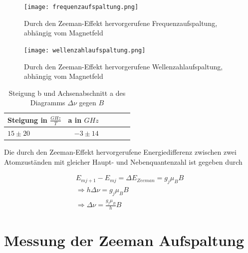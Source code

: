 \documentclass[10pt,a4paper]{article}
\begin{document}
\begin{figure}[h]
	\texttt{[image: frequenzaufspaltung.png]}
	\centering
	\caption{Durch den Zeeman-Effekt hervorgerufene Frequenzaufspaltung, abhängig vom Magnetfeld}
	\label{diagramm_aufspaltung}
\end{figure}
\begin{figure}[h]
	\texttt{[image: wellenzahlaufspaltung.png]}
	\centering
	\caption{Durch den Zeeman-Effekt hervorgerufene Wellenzahlaufspaltung, abhängig vom Magnetfeld}
	\label{diagramm_aufspaltung_wellenzahl}
\end{figure}


\begin{table}[h!]
	\centering
	\begin{tabular}{|l|r|c|lrp{16cm}}\hline
		Steigung in $\frac{GHz}{T}$ & a in $GHz$\\\hline
		$15 \pm 20$ & $-3 \pm 14$\\\hline
	\end{tabular}
	\caption{Steigung b und Achsenabschnitt a  des Diagramms $\Delta\nu$ gegen $B$}
	\label{diagramm_werte}
\end{table}



Die durch den Zeeman-Effekt hervorgerufene Energiedifferenz zwischen zwei Atomzuständen mit gleicher Haupt- und Nebenquantenzahl ist gegeben durch

\begin{align}
	E_{mj+1}- E_{mj} = \Delta E_{Zeeman} = g_j \mu_B B \\
	\Rightarrow h \Delta \nu =  g_j \mu_B B \\
	\Rightarrow \Delta \nu = \frac{g_j \mu_B}{h} B
	\label{steigungnu}
\end{align}

\section{Messung der Zeeman Aufspaltung}
\\
\end{document}
